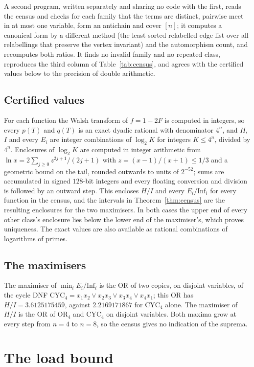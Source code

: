 \documentclass[11pt]{amsart}
\theoremstyle{remark}
\newcommand{\Inf}{\mathrm{Inf}}
\begin{document}
A second program, written separately and sharing no code with the first, reads the census and checks for each family
that the terms are distinct, pairwise meet in at most one variable, form an antichain and cover $[n]$; it computes a
canonical form by a different method (the least sorted relabelled edge list over all relabellings that preserve the
vertex invariant) and the automorphism count, and recomputes both ratios. It finds no invalid family and no repeated
class, reproduces the third column of Table~\ref{tab:census}, and agrees with the certified values below to the
precision of double arithmetic.

\subsection{Certified values}
For each function the Walsh transform of $f=1-2F$ is computed in integers, so every $p(T)$ and $q(T)$ is an exact
dyadic rational with denominator $4^n$, and $H$, $I$ and every $E_i$ are integer combinations of $\log_2K$ for
integers $K\le4^n$, divided by $4^n$. Enclosures of $\log_2K$ are computed in integer arithmetic from
$\ln x=2\sum_{j\ge0}z^{2j+1}/(2j+1)$ with $z=(x-1)/(x+1)\le1/3$ and a geometric bound on the tail, rounded outwards to
units of $2^{-52}$; sums are accumulated in signed $128$-bit integers and every floating conversion and division is
followed by an outward step. This encloses $H/I$ and every $E_i/\Inf_i$ for every function in the census, and the
intervals in Theorem~\ref{thm:census} are the resulting enclosures for the two maximisers. In both cases the upper end
of every other class's enclosure lies below the lower end of the maximiser's, which proves uniqueness. The exact values
are also available as rational combinations of logarithms of primes.

\subsection{The maximisers}
The maximiser of $\min_iE_i/\Inf_i$ is the OR of two copies, on disjoint variables, of the cycle DNF
$\mathrm{CYC}_4=x_1x_2\vee x_2x_3\vee x_3x_4\vee x_4x_1$; this OR has $H/I=3.6125175459$, against $2.2169171867$ for $\mathrm{CYC}_4$
alone. The maximiser of $H/I$ is the OR of
$\mathrm{OR}_4$ and $\mathrm{CYC}_4$ on disjoint variables. Both maxima grow at every step from $n=4$ to $n=8$, so the census
gives no indication of the suprema.

\section{The load bound}\label{sec:mix}
\end{document}
